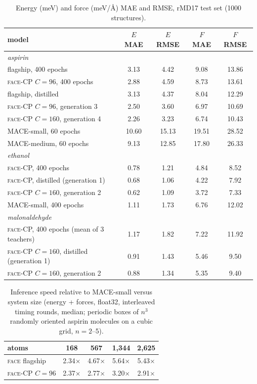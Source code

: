 \documentclass[journal=jctcce,manuscript=suppinfo,layout=traditional]{achemso}
\newcommand{\FACE}{\textsc{face}}
\begin{document}
\begin{table}[h]
\caption{Energy (meV) and force (meV/\AA) MAE and RMSE, rMD17 test set (1000 structures).}
\label{tab:rmse}
\begin{tabular}{lcccc}
\toprule
model & $E$ MAE & $E$ RMSE & $F$ MAE & $F$ RMSE \\
\midrule
\multicolumn{5}{l}{\emph{aspirin}} \\
flagship, 400 epochs & 3.13 & 4.42 & 9.08 & 13.86 \\
\FACE-CP $C=96$, 400 epochs & 2.88 & 4.59 & 8.73 & 13.61 \\
flagship, distilled & 3.13 & 4.37 & 8.04 & 12.29 \\
\FACE-CP $C=96$, generation 3 & 2.50 & 3.60 & 6.97 & 10.69 \\
\FACE-CP $C=160$, generation 4 & 2.26 & 3.23 & 6.74 & 10.43 \\
MACE-small, 60 epochs & 10.60 & 15.13 & 19.51 & 28.52 \\
MACE-medium, 60 epochs & 9.13 & 12.85 & 17.80 & 26.33 \\
\midrule
\multicolumn{5}{l}{\emph{ethanol}} \\
\FACE-CP, 400 epochs & 0.78 & 1.21 & 4.84 & 8.52 \\
\FACE-CP, distilled (generation 1) & 0.68 & 1.06 & 4.22 & 7.92 \\
\FACE-CP $C=160$, generation 2 & 0.62 & 1.09 & 3.72 & 7.33 \\
MACE-small, 400 epochs & 1.11 & 1.73 & 6.76 & 12.02 \\
\midrule
\multicolumn{5}{l}{\emph{malonaldehyde}} \\
\FACE-CP, 400 epochs (mean of 3 teachers) & 1.17 & 1.82 & 7.22 & 11.92 \\
\FACE-CP $C=160$, distilled (generation 1) & 0.91 & 1.43 & 5.46 & 9.50 \\
\FACE-CP $C=160$, generation 2 & 0.88 & 1.34 & 5.35 & 9.40 \\
\bottomrule
\end{tabular}
\end{table}

\begin{table}[h]
\caption{Inference speed relative to MACE-small versus system size (energy + forces, float32, interleaved timing
rounds, median; periodic boxes of $n^3$ randomly oriented aspirin molecules on a cubic grid, $n=2$--5).}
\label{tab:scaling}
\begin{tabular}{lcccc}
\toprule
atoms & 168 & 567 & 1,344 & 2,625 \\
\midrule
\FACE{} flagship & 2.34$\times$ & 4.67$\times$ & 5.64$\times$ & 5.43$\times$ \\
\FACE-CP $C=96$ & 2.37$\times$ & 2.77$\times$ & 3.20$\times$ & 2.91$\times$ \\
\bottomrule
\end{tabular}
\end{table}
\end{document}
